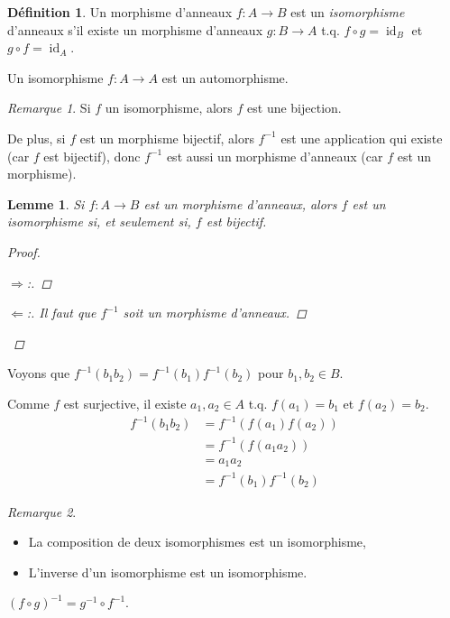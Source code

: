 \documentclass{report}
\newtheorem*{lem}{Lemme}
\theoremstyle{definition}
\newtheorem*{dfn}{D\'efinition}
\theoremstyle{remark}
\newtheorem*{rmq}{Remarque}
\newenvironment*{subproof}[1][D\'emonstration]
{
\begin{proof}[#1]

}
{
\renewcommand{\qedsymbol}{$\blacksquare$}
\end{proof}
\renewcommand{\qedsymbol}{$\square$}
}
\begin{document}
	\begin{dfn}
		Un morphisme d'anneaux $f:A\to B$ est un \emph{isomorphisme} d'anneaux s'il existe un morphisme d'anneaux $g:B\to A$ t.q. $f\circ g=\operatorname{id}_B$ et $g\circ f=\operatorname{id}_A$.

		Un isomorphisme $f:A\to A$ est un automorphisme.
	\end{dfn}

	\begin{rmq}
		Si $f$ un isomorphisme, alors $f$ est une bijection.

		De plus, si $f$ est un morphisme bijectif, alors $f^{-1}$ est une application qui existe (car $f$ est bijectif), donc $f^{-1}$ est aussi un morphisme d'anneaux (car $f$ est un morphisme).
	\end{rmq}

	\begin{lem}
		Si $f:A\to B$ est un morphisme d'anneaux, alors $f$ est un isomorphisme si, et seulement si, $f$ est bijectif.
		\begin{proof}
			\begin{subproof}[$\Rightarrow$:]
				\checkmark
			\end{subproof}
			\begin{subproof}[$\Leftarrow$:]
				Il faut que $f^{-1}$ soit un morphisme d'anneaux.
			\end{subproof}
		\end{proof}
	\end{lem}

	Voyons que $f^{-1}(b_1b_2)=f^{-1}(b_1)f^{-1}(b_2)$ pour $b_1,b_2\in B$.

	Comme $f$ est surjective, il existe $a_1,a_2\in A$ t.q. $f(a_1)=b_1$ et $f(a_2)=b_2$.
	\begin{align*}
		f^{-1}(b_1b_2)&= f^{-1}(f(a_1)f(a_2))\\
		&= f^{-1}(f(a_1a_2))\\
		&= a_1a_2\\
		&= f^{-1}(b_1)f^{-1}(b_2)
	\end{align*}

	\begin{rmq}
		\begin{itemize}
			\item La composition de deux isomorphismes est un isomorphisme,
			\item L'inverse d'un isomorphisme est un isomorphisme.
		\end{itemize}

		$(f\circ g)^{-1}=g^{-1}\circ f^{-1}$.
	\end{rmq}
\end{document}
